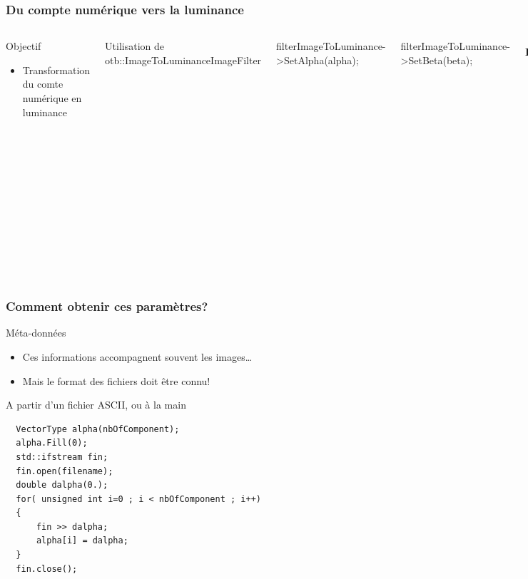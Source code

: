 \documentclass[compress,handout]{beamer}
\begin{document}
\begin{frame}

  \frametitle{Du compte numérique vers la luminance}
     \begin{columns}

  \begin{block}{Objectif}
   \begin{itemize}
    \item Transformation du comte numérique en luminance
   \end{itemize}
  \end{block}
  Utilisation de otb::ImageToLuminanceImageFilter

  filterImageToLuminance->SetAlpha(alpha);

  filterImageToLuminance->SetBeta(beta);

  \footnotesize
  \begin{equation*}
   \mathbf{L_{TOA}^{k}} = \frac{ X^{k} } { \alpha_{k} } + \beta_{k}
  \end{equation*}
  \begin{itemize}
  \item $\mathbf{L_{TOA}^{k}}$ est la luminance incidente (en
  $W.m^{-2}.sr^{-1}.\mu m^{-1}$)
  \item $\mathbf{X^{k}}$  comte numérique
  \item $\alpha_{k}$ gain d'étalonnage pour la bande k
  \item $\beta_{k}$ biais d'étalonnage pour la bande k
  \end{itemize}

  \end{columns}
\end{frame}

\begin{frame}[fragile]
  \frametitle{Comment obtenir ces paramètres?}
  \begin{block}{Méta-données}
   \begin{itemize}
    \footnotesize
    \item Ces informations accompagnent souvent les images\ldots
    \item Mais le format des fichiers doit être connu!
   \end{itemize}
  \end{block}
  \begin{block}{A partir d'un fichier ASCII, ou à la main}
  \footnotesize
  \begin{verbatim}
  VectorType alpha(nbOfComponent);
  alpha.Fill(0);
  std::ifstream fin;
  fin.open(filename);
  double dalpha(0.);
  for( unsigned int i=0 ; i < nbOfComponent ; i++)
  {
      fin >> dalpha;
      alpha[i] = dalpha;
  }
  fin.close();
  \end{verbatim}
  \end{block}
\end{frame}
\end{document}
